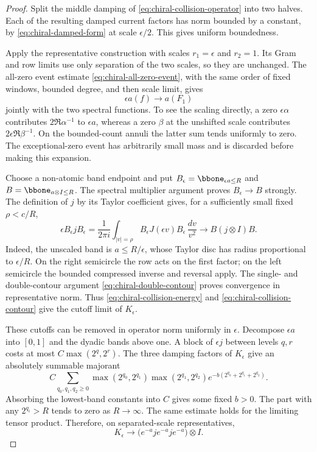 \begin{proof}
Split the middle damping of \eqref{eq:chiral-collision-operator} into
two halves. Each of the resulting damped current factors has norm bounded
by a constant, by \eqref{eq:chiral-damped-form} at scale $\epsilon/2$.
This gives uniform boundedness.

Apply the representative construction with scales $r_1=\epsilon$ and
$r_2=1$. Its Gram and row limits use only separation of the two scales,
so they are unchanged. The all-zero event estimate
\eqref{eq:chiral-all-zero-event}, with the same order of fixed windows,
bounded degree, and then scale limit, gives
\begin{equation}\label{eq:chiral-collision-energy}
                     \epsilon a(f)\longrightarrow a(F_1)
\end{equation}
jointly with the two spectral functions. To see the scaling directly,
a zero $\epsilon\alpha$ contributes $2\Re\alpha^{-1}$ to $\epsilon a$,
whereas a zero $\beta$ at the unshifted scale contributes
$2\epsilon\Re\beta^{-1}$. On the bounded-count annuli the latter
sum tends uniformly to zero. The exceptional-zero event has arbitrarily
small mass and is discarded before making this expansion.

Choose a non-atomic band endpoint and put
$B_\epsilon=\bbone_{\epsilon a\le R}$ and
$B=\bbone_{a\otimes I\le R}$. The spectral multiplier argument proves
$B_\epsilon\to B$ strongly. The definition of $j$ by its Taylor
coefficient gives, for a sufficiently small fixed $\rho<c/R$,
\begin{equation}\label{eq:chiral-collision-contour}
 \epsilon B_\epsilon jB_\epsilon
   =\frac1{2\pi i}\int_{|v|=\rho}
             B_\epsilon J(\epsilon v)B_\epsilon\,\frac{dv}{v^2}
   \longrightarrow B(j\otimes I)B.
\end{equation}
Indeed, the unscaled band is $a\le R/\epsilon$, whose Taylor disc
has radius proportional to $\epsilon/R$. On the right semicircle
the row acts on the first factor; on the left semicircle the bounded
compressed inverse and reversal apply. The single- and double-contour
argument \eqref{eq:chiral-double-contour} proves convergence in
representative norm. Thus \eqref{eq:chiral-collision-energy} and
\eqref{eq:chiral-collision-contour} give the cutoff limit of
$K_\epsilon$.

These cutoffs can be removed in operator norm uniformly in $\epsilon$.
Decompose $\epsilon a$ into $[0,1]$ and the dyadic bands above one.
A block of $\epsilon j$ between levels $q,r$ costs at most
$C\max(2^q,2^r)$. The three damping factors of $K_\epsilon$ give an
absolutely summable majorant
\[
 C\sum_{q_0,q_1,q_2\ge0}
   \max(2^{q_0},2^{q_1})\max(2^{q_1},2^{q_2})
                       e^{-b(2^{q_0}+2^{q_1}+2^{q_2})}.
\]
Absorbing the lowest-band constants into $C$ gives some fixed $b>0$.
The part with any $2^{q_i}>R$ tends to zero as $R\to\infty$.
The same estimate holds for the limiting tensor product. Therefore,
on separated-scale representatives,
\[
 K_\epsilon\longrightarrow
           \bigl(e^{-a}je^{-a}je^{-a}\bigr)\otimes I.
\]


\end{proof}
